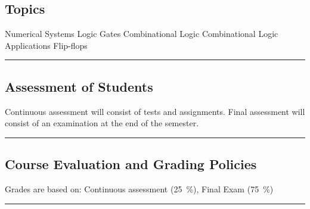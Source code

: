 
\subsection*{Topics}
\begin{outline}
    \1 Numerical Systems
    \1 Logic Gates
    \1 Combinational Logic
    \1 Combinational Logic Applications
    \1 Flip-flops
\end{outline}
\vspace{2ex} \hrule\vspace{2ex}

\subsection*{Assessment of Students}
\begin{outline}
    \1 Continuous assessment will consist of tests and assignments.
    \1 Final assessment will consist of an examination at the end of the semester.
\end{outline}
\vspace{2ex}\hrule\vspace{2ex}

\subsection*{Course Evaluation and Grading Policies}
Grades are based on:
Continuous assessment (\qty{25}{\percent}),
Final Exam (\qty{75}{\percent})
\vspace{2ex}\hrule\vspace{2ex}


